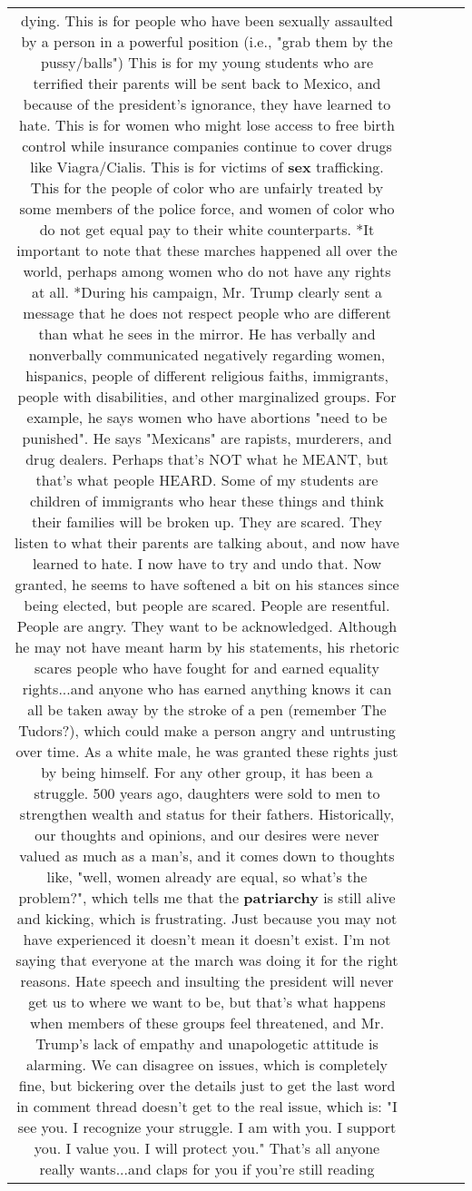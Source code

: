 \documentclass[11pt]{article}
\newlength\mylength
\begin{document}
\begin{center}
\begin{longtable}{|C{.65\mylength}|C{.30\mylength}|C{.12\mylength}|C{.12\mylength}|C{.12\mylength}|}
dying. This is for people who have been sexually assaulted by a person in a powerful position (i.e., "grab them by the pussy/balls") This is for my young students who are terrified their parents will be sent back to Mexico, and because of the president's ignorance, they have learned to hate. This is for women who might lose access to free birth control while insurance companies continue to cover drugs like Viagra/Cialis. This is for victims of \textbf{sex} trafficking. This for the people of color who are unfairly treated by some members of the police force, and women of color who do not get equal pay to their white counterparts. *It important to note that these marches happened all over the world, perhaps among women who do not have any rights at all. *During his campaign, Mr. Trump clearly sent a message that he does not respect people who are different than what he sees in the mirror. He has verbally and nonverbally communicated negatively regarding women, hispanics, people of different religious faiths, immigrants, people with disabilities, and other marginalized groups. For example, he says women who have abortions "need to be punished". He says "Mexicans" are rapists, murderers, and drug dealers. Perhaps that's NOT what he MEANT, but that's what people HEARD. Some of my students are children of immigrants who hear these things and think their families will be broken up. They are scared. They listen to what their parents are talking about, and now have learned to hate. I now have to try and undo that. Now granted, he seems to have softened a bit on his stances since being elected, but people are scared. People are resentful. People are angry. They want to be acknowledged. Although he may not have meant harm by his statements, his rhetoric scares people who have fought for and earned equality rights...and anyone who has earned anything knows it can all be taken away by the stroke of a pen (remember The Tudors?), which could make a person angry and untrusting over time. As a white male, he was granted these rights just by being himself. For any other group, it has been a struggle. 500 years ago, daughters were sold to men to strengthen wealth and status for their fathers. Historically, our thoughts and opinions, and our desires were never valued as much as a man's, and it comes down to thoughts like, "well, women already are equal, so what's the problem?", which tells me that the \textbf{patriarchy} is still alive and kicking, which is frustrating. Just because you may not have experienced it doesn't mean it doesn't exist. I'm not saying that everyone at the march was doing it for the right reasons. Hate speech and insulting the president will never get us to where we want to be, but that's what happens when members of these groups feel threatened, and Mr. Trump's lack of empathy and unapologetic attitude is alarming. We can disagree on issues, which is completely fine, but bickering over the details just to get the last word in comment thread doesn't get to the real issue, which is: "I see you. I recognize your struggle. I am with you. I support you. I value you. I will protect you." That's all anyone really wants...and claps for you if you're still reading 
\end{longtable}
\end{center}
\end{document}
